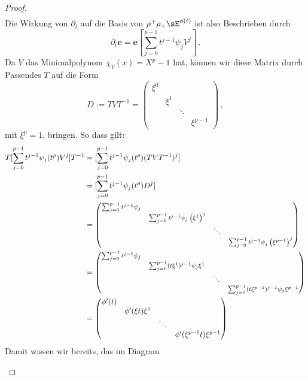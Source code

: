 \begin{proof}
\begin{align*}
\end{align*}
Die Wirkung von $\partial_t$ auf die Basis von $\rho^+\rho_+\sE^{\phi(t)}$ ist
also Beschrieben durch
\[
\partial_t\mathbf{e}=\mathbf{e}[\sum_{j=0}^{p-1}t^{j-1}\psi_jV^j] \,.
\]
Da $V$ das Minimalpolynom $\chi_V(x)=X^p-1$ hat, können wir diese Matrix durch
Passendes $T$ auf die Form
\[
D:=TVT^{-1}=\begin{pmatrix}\xi^{0}\\
 & \xi^{1}\\
 &  & \ddots\\
 &  &  & \xi^{p-1}
\end{pmatrix} \,,
\]
mit $\xi^p=1$, bringen.
So dass gilt:
\begin{align*}
  T[\sum_{j=0}^{p-1}t^{j-1}\psi_j(t^p)V^j]T^{-1} 
  &= [\sum_{j=0}^{p-1}t^{j-1}\psi_j(t^p) (TVT^{-1})^j]\\
  &= [\sum_{j=0}^{p-1}t^{j-1}\psi_j(t^p)D^j]\\
  &=
{
  \footnotesize
  \begin{pmatrix}\sum_{j=0}^{p-1}t^{j-1}\psi_{j}\\
    & \sum_{j=0}^{p-1}t^{j-1}\psi_{j}\left(\xi^{1}\right)^{j}\\
    & & \ddots\\
    &  &  & \sum_{j=0}^{p-1}t^{j-1}\psi_{j}\left(\xi^{p-1}\right)^{j}
  \end{pmatrix}
}\\
  &=
{
  \footnotesize
  \begin{pmatrix}\sum_{j=0}^{p-1}t^{j-1}\psi_{j}\\
    & \sum_{j=0}^{p-1}(t\xi^1)^{j-1}\psi_{j}\xi^{1}\\
    & & \ddots\\
    &  &  & \sum_{j=0}^{p-1}(t\xi^{p-1})^{j-1}\psi_{j}\xi^{p-1}
  \end{pmatrix}
}\\
  &= \begin{pmatrix}\phi'(t)\\
    & \phi'(\xi t)\xi^{1}\\
    & & \ddots\\
    &  &  & \phi'(\xi^{p-1} t)\xi^{p-1}
  \end{pmatrix}\\
\end{align*}
Damit wissen wir bereits, das im Diagram
\begin{center}
  \begin{tikzpicture} [scale=3.3, descr/.style={fill=white,inner sep=2.5pt} ]

\end{tikzpicture}
\end{center}
\end{proof}
